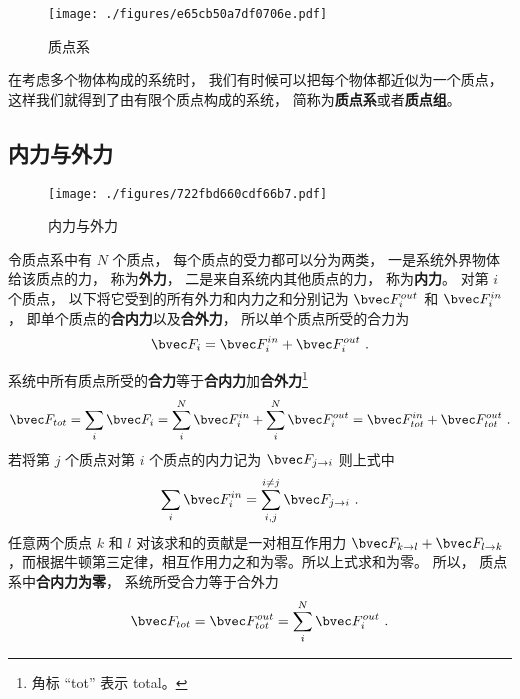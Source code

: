
\begin{figure}[ht]
\centering
\texttt{[image: ./figures/e65cb50a7df0706e.pdf]}
\caption{质点系} \label{fig_PSys_1}
\end{figure}

在考虑多个物体构成的系统时， 我们有时候可以把每个物体都近似为一个质点， 这样我们就得到了由有限个质点构成的系统， 简称为\textbf{质点系}或者\textbf{质点组}。

\subsection{内力与外力}
\begin{figure}[ht]
\centering
\texttt{[image: ./figures/722fbd660cdf66b7.pdf]}
\caption{内力与外力} \label{fig_PSys_2}
\end{figure}
令质点系中有 $N$ 个质点， 每个质点的受力都可以分为两类， 一是系统外界物体给该质点的力， 称为\textbf{外力}， 二是来自系统内其他质点的力， 称为\textbf{内力}。 对第 $i$ 个质点， 以下将它受到的所有外力和内力之和分别记为 $\bvec F_i^{out}$ 和 $\bvec F_i^{in}$， 即单个质点的\textbf{合内力}以及\textbf{合外力}， 所以单个质点所受的合力为
\begin{equation}
\bvec F_i = \bvec F_i^{in} + \bvec F_i^{out}~.
\end{equation}

系统中所有质点所受的\textbf{合力}等于\textbf{合内力}加\textbf{合外力}\footnote{角标 “tot” 表示 total。}
\begin{equation}
\bvec F_{tot} = \sum_i \bvec F_i = \sum_i^N \bvec F_i^{in} + \sum_i^N \bvec F_i^{out} = \bvec F_{tot}^{in} + \bvec F_{tot}^{out}~.
\end{equation}
若将第 $j$ 个质点对第 $i$ 个质点的内力记为 $\bvec F_{j\to i}$ 则上式中
\begin{equation}
\sum_i \bvec F_i^{in} = \sum_{i,j}^{i \ne j} \bvec F_{j \to i}~.
\end{equation}
任意两个质点 $k$ 和 $l$ 对该求和的贡献是一对相互作用力 $\bvec F_{k \to l} + \bvec F_{l \to k}$，而根据牛顿第三定律，相互作用力之和为零。所以上式求和为零。 所以， 质点系中\textbf{合内力为零}， 系统所受合力等于合外力
\begin{equation}
\bvec F_{tot} = \bvec F_{tot}^{out} = \sum_i^N \bvec F_i^{out}~.
\end{equation}
